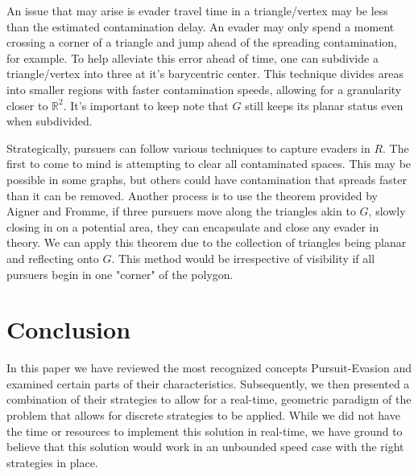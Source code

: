 \documentclass{article}
\begin{document}
An issue that may arise is evader travel time in a triangle/vertex may be less than the estimated contamination delay. An evader may only spend a moment crossing a corner of a triangle and jump ahead of the spreading contamination, for example. To help alleviate this error ahead of time, one can subdivide a triangle/vertex into three at it's barycentric center. This technique divides areas into smaller regions with faster contamination speeds, allowing for a granularity closer to \(\mathbb{R}^2\). It's important to keep note that \(G\) still keeps its planar status even when subdivided.

Strategically, pursuers can follow various techniques to capture evaders in \(R\). The first to come to mind is attempting to clear all contaminated spaces. This may be possible in some graphs, but others could have contamination that spreads faster than it can be removed. Another process is to use the theorem provided by Aigner and Fromme, if three pursuers move along the triangles akin to \(G\), slowly closing in on a potential area, they can encapsulate and close any evader in theory. We can apply this theorem due to the collection of triangles being planar and reflecting onto \(G\). This method would be irrespective of visibility if all pursuers begin in one "corner" of the polygon. 

\section{Conclusion}
In this paper we have reviewed the most recognized concepts Pursuit-Evasion and examined certain parts of their characteristics. Subsequently, we then presented a combination of their strategies to allow for a real-time, geometric paradigm of the problem that allows for discrete strategies to be applied. While we did not have the time or resources to implement this solution in real-time, we have ground to believe that this solution would work in an unbounded speed case with the right strategies in place.
\end{document}
